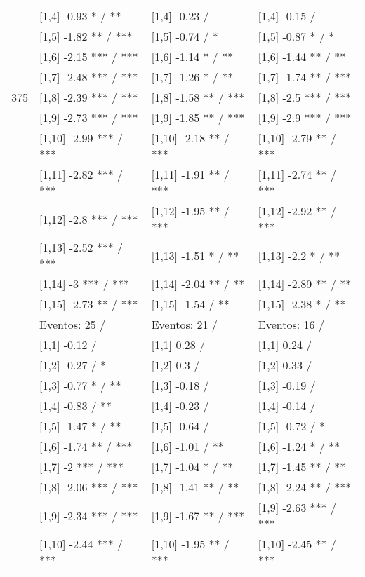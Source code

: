 \begin{table}
\begin{tabular}[t]{llll}
\addlinespace
 & {}[1,4] -0.93 * / ** & {}[1,4] -0.23  / & {}[1,4] -0.15  /\\
 & {}[1,5] -1.82 ** / *** & {}[1,5] -0.74  / * & {}[1,5] -0.87 * / *\\
 & {}[1,6] -2.15 *** / *** & {}[1,6] -1.14 * / ** & {}[1,6] -1.44 ** / **\\
 & {}[1,7] -2.48 *** / *** & {}[1,7] -1.26 * / ** & {}[1,7] -1.74 ** / ***\\
375 & {}[1,8] -2.39 *** / *** & {}[1,8] -1.58 ** / *** & {}[1,8] -2.5 *** / ***\\
\addlinespace
 & {}[1,9] -2.73 *** / *** & {}[1,9] -1.85 ** / *** & {}[1,9] -2.9 *** / ***\\
 & {}[1,10] -2.99 *** / *** & {}[1,10] -2.18 ** / *** & {}[1,10] -2.79 ** / ***\\
 & {}[1,11] -2.82 *** / *** & {}[1,11] -1.91 ** / *** & {}[1,11] -2.74 ** / ***\\
 & {}[1,12] -2.8 *** / *** & {}[1,12] -1.95 ** / *** & {}[1,12] -2.92 ** / ***\\
 & {}[1,13] -2.52 *** / *** & {}[1,13] -1.51 * / ** & {}[1,13] -2.2 * / **\\
\addlinespace
 & {}[1,14] -3 *** / *** & {}[1,14] -2.04 ** / ** & {}[1,14] -2.89 ** / **\\
 & {}[1,15] -2.73 ** / *** & {}[1,15] -1.54  / ** & {}[1,15] -2.38 * / **\\
 & Eventos:  25 / & Eventos:  21 / & Eventos:  16 /\\
 & {}[1,1] -0.12  / & {}[1,1] 0.28  / & {}[1,1] 0.24  /\\
 & {}[1,2] -0.27  / * & {}[1,2] 0.3  / & {}[1,2] 0.33  /\\
\addlinespace
 & {}[1,3] -0.77 * / ** & {}[1,3] -0.18  / & {}[1,3] -0.19  /\\
 & {}[1,4] -0.83  / ** & {}[1,4] -0.23  / & {}[1,4] -0.14  /\\
 & {}[1,5] -1.47 * / ** & {}[1,5] -0.64  / & {}[1,5] -0.72  / *\\
 & {}[1,6] -1.74 ** / *** & {}[1,6] -1.01  / ** & {}[1,6] -1.24 * / **\\
 & {}[1,7] -2 *** / *** & {}[1,7] -1.04 * / ** & {}[1,7] -1.45 ** / **\\
\addlinespace
500 & {}[1,8] -2.06 *** / *** & {}[1,8] -1.41 ** / ** & {}[1,8] -2.24 ** / ***\\
 & {}[1,9] -2.34 *** / *** & {}[1,9] -1.67 ** / *** & {}[1,9] -2.63 *** / ***\\
 & {}[1,10] -2.44 *** / *** & {}[1,10] -1.95 ** / *** & {}[1,10] -2.45 ** / ***\\

\end{tabular}
\end{table}
